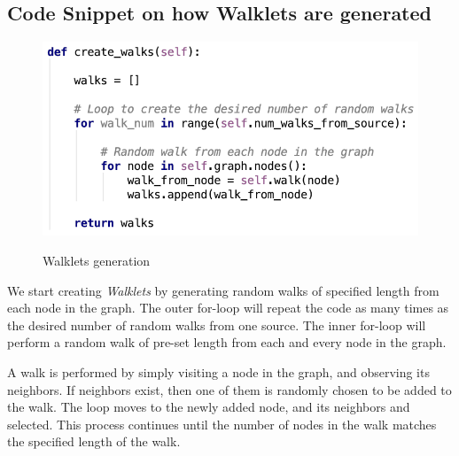 \documentclass[a4paper,13pt]{article}
\begin{document}
\subsection{Code Snippet on how Walklets are generated}
    \begin{figure}[h!]
        \center
        {\includegraphics[scale=0.6]{screen-shots/walklets_create_walks.png}}
        \caption{Walklets generation}
        \label{fig:my_label}
    \end{figure}
    \FloatBarrier 

We start creating \textit{Walklets} by generating random walks of specified length from each node in the graph. The outer for-loop will repeat the code as many times as the desired number of random walks from one source. The inner for-loop will perform a random walk of pre-set length from each and every node in the graph.

A walk is performed by simply visiting a node in the graph, and observing its neighbors. If neighbors exist, then one of them is randomly chosen to be added to the walk. The loop moves to the newly added node, and its neighbors and selected. This process continues until the number of nodes in the walk matches the specified length of the walk.
\end{document}
